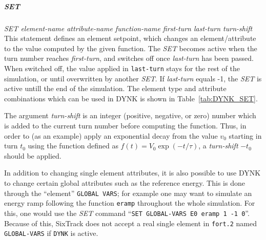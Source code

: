 \documentclass[a4paper,11pt]{report}
\begin{document}
\subparagraph{SET} \emph{SET element-name attribute-name function-name first-turn last-turn turn-shift}\\
This statement defines an element setpoint, which changes an element/attribute to the value computed by the given function.
The \emph{SET} becomes active when the turn number reaches \emph{first-turn}, and switches off once \emph{last-turn} has been passed.
When switched off, the value applied in \texttt{last-turn} stays for the rest of the simulation, or until overwritten by another \emph{SET}.
If \emph{last-turn} equals -1, the \emph{SET} is active untill the end of the simulation.
The element type and attribute combinations which can be used in DYNK is shown in Table~\ref{tab:DYNK_SET}.

The argument \emph{turn-shift} is an integer (positive, negative, or zero) number which is added to the current turn number before computing the function.
Thus, in order to (as an example) apply an exponential decay from the value $v_0$ starting in turn $t_0$ using the function defined as $f(t) = V_0 \exp(-t/\tau)$,
a \emph{turn-shift} $-t_0$ should be applied.

In addition to changing single element attributes, it is also possible to use DYNK to change certain global attributes such as the reference energy.
This is done through the ``element'' \texttt{GLOBAL VARS}; for example one may want to simulate an energy ramp following the function \texttt{eramp} throughout the whole simulation.
For this, one would use the \emph{SET} command ``\texttt{SET GLOBAL-VARS E0 eramp 1 -1 0}''.
Because of this, SixTrack does not accept a real single element in \texttt{fort.2} named \texttt{GLOBAL-VARS} if \texttt{DYNK} is active.
\end{document}
